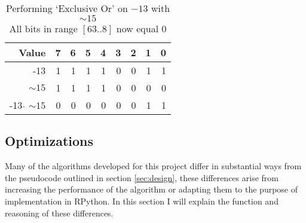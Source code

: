 \documentclass[12pt]{article}
\begin{document}
\par
\begin{table}[htpb]
	\centering
	\begin{tabular}{r|rrrrrrrr}
		\hline
		 Value     &   7 &   6 &   5 &   4 &   3 &   2 &   1 &   0 \\
		\hline
		 -13       &   1 &   1 &   1 &   1 &   0 &   0 &   1 &   1 \\
		 $\sim15$       &   1 &   1 &   1 &   1 &   0 &   0 &   0 &   0 \\
		 -13  $\hat{}$ $\sim15$ &   0 &   0 &   0 &   0 &   0 &   0 &   1 &   1 \\
		\hline
		\end{tabular}
	\caption{Performing `Exclusive Or' on $-13$ with $\sim15$ \\ All bits in range $[63 .. 8]$ now equal 0}
\end{table}


\pagebreak
\subsection{Optimizations}
Many of the algorithms developed for this project differ in substantial ways from the pseudocode outlined in section \ref{sec:design}, these differences arise from increasing the performance of the algorithm or adapting them to the purpose of implementation in RPython. In this section I will explain the function and reasoning of these differences.
\end{document}
